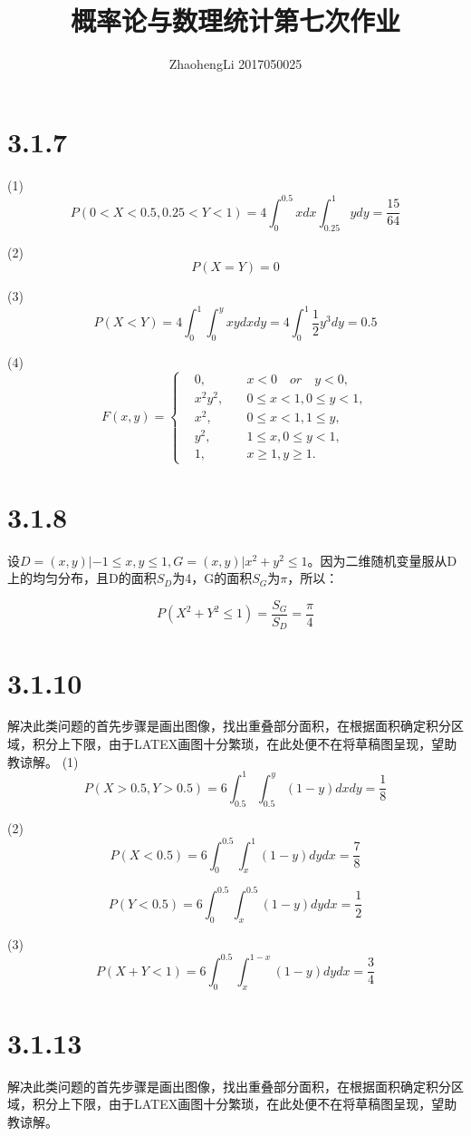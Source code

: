 \documentclass{article}
\title{概率论与数理统计第七次作业}
\author{ZhaohengLi 2017050025}
\begin{document}
\maketitle

\section{3.1.7}
(1)
$$P(0<X<0.5,0.25<Y<1)=4\int^{0.5}_0xdx\int^1_{0.25}ydy=\frac{15}{64}$$

(2)
$$P(X=Y)=0$$

(3)
$$P(X<Y)=4\int^1_0\int^y_0xydxdy=4\int_0^1\frac12y^3dy=0.5$$

(4)
\begin{equation}
F(x,y)=\left\{
\begin{aligned}
&0,&\quad x<0 \quad or \quad y<0,\\
&x^2y^2,&\quad0\leq x <1,0\leq y<1,\\
&x^2,&\quad 0\leq x < 1, 1 \leq y,\\
&y^2,&\quad 1\leq x,0\leq y<1,\\
&1,&\quad x\geq1,y\geq1.
\end{aligned}
\right.
\end{equation}
\section{3.1.8}
设$D={(x,y)|-1\leq x,y \leq 1},G={(x,y)|x^2+y^2\leq 1}$。因为二维随机变量服从D上的均匀分布，且D的面积$S_D$为4，G的面积$S_G$为$\pi$，所以：

$$P(X^2+Y^2\leq 1)=\frac{S_G}{S_D}=\frac{\pi}{4}$$


\section{3.1.10}
解决此类问题的首先步骤是画出图像，找出重叠部分面积，在根据面积确定积分区域，积分上下限，由于LATEX画图十分繁琐，在此处便不在将草稿图呈现，望助教谅解。
(1)
$$P(X>0.5,Y>0.5)=6\int^1_{0.5}\int^y_{0.5}(1-y)dxdy=\frac18$$

(2)
$$P(X<0.5)=6\int^{0.5}_{0}\int^{1}_{x}(1-y)dydx=\frac78$$


$$P(Y<0.5)=6\int^{0.5}_{0}\int^{0.5}_{x}(1-y)dydx=\frac12$$

(3)
$$P(X+Y<1)=6\int^{0.5}_{0}\int^{1-x}_{x}(1-y)dydx=\frac34$$

\section{3.1.13}
解决此类问题的首先步骤是画出图像，找出重叠部分面积，在根据面积确定积分区域，积分上下限，由于LATEX画图十分繁琐，在此处便不在将草稿图呈现，望助教谅解。
\end{document}
